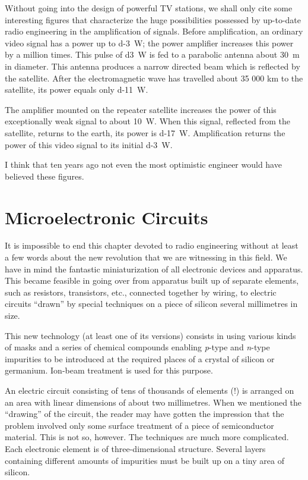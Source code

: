 Without going into the design of powerful TV stations, we shall only cite some interesting figures that characterize the huge possibilities possessed by up-to-date radio engineering in the amplification of signals. Before amplification, an ordinary video signal has a power up to \SI{d-3}{\watt}; the power amplifier increases this power by a million times. This pulse of \SI{d3}{\watt} is fed to a parabolic antenna about \SI{30}{\meter} in diameter. This antenna produces a narrow directed beam which is reflected by the satellite. After the electromagnetic wave has travelled about 35 000 km to the satellite, its power equals only \SI{d-11}{\watt}.

The amplifier mounted on the repeater satellite increases the power of this exceptionally weak signal to about \SI{10}{\watt}. When this signal, reflected from the satellite, returns to the earth, its power is \SI{d-17}{\watt}. Amplification returns the power of this video signal to its initial \SI{d-3}{\watt}.

I think that ten years ago not even the most optimistic engineer would have believed these figures.

\section{Microelectronic Circuits}
It is impossible to end this chapter devoted to radio engineering without at least a few words about the new revolution that we are witnessing in this field.
We have in mind the fantastic miniaturization of all electronic devices and apparatus. This became feasible in going over from apparatus built up of separate elements, such as resistors, transistors, etc., connected together by wiring, to electric circuits ``drawn'' by special techniques on a piece of silicon several millimetres in size.

This new technology (at least one of its versions) consists in using various kinds of masks and a series of chemical compounds enabling \emph{p}-type and \emph{n}-type impurities to be introduced at the required places of a crystal of silicon or germanium. Ion-beam treatment is used for this purpose.

An electric circuit consisting of tens of thousands of elements (!) is arranged on an area with linear dimensions of about two millimetres. When we mentioned the 
``drawing'' of the circuit, the reader may have gotten the impression that the problem involved only some surface treatment of a piece of semiconductor material. This is not so, however. The techniques are much more complicated. Each electronic element is of three-dimensional structure. Several layers containing different amounts of impurities must be built up on a tiny area of silicon.

